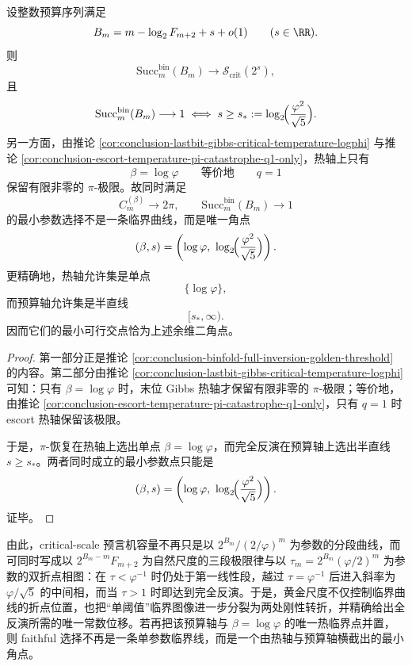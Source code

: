 \begin{theorem}[热轴与预算轴的余维二角点]\label{thm:conclusion-binfold-thermal-budget-codimtwo-corner}
设整数预算序列满足
\[
B_m=m-\log_2F_{m+2}+s+o(1)
\qquad (s\in\RR).
\]
则
\[
\mathrm{Succ}_m^{\mathrm{bin}}(B_m)\longrightarrow \mathcal S_{\mathrm{crit}}(2^s),
\]
且
\[
\mathrm{Succ}_m^{\mathrm{bin}}(B_m)\longrightarrow 1
\iff
s\ge s_*:=\log_2\!\Bigl(\frac{\varphi^2}{\sqrt5}\Bigr).
\]
另一方面，由推论 \ref{cor:conclusion-lastbit-gibbs-critical-temperature-logphi} 与推论 \ref{cor:conclusion-escort-temperature-pi-catastrophe-q1-only}，热轴上只有
\[
\beta=\log\varphi
\qquad\text{等价地}\qquad
q=1
\]
保留有限非零的 \(\pi\)-极限。故同时满足
\[
C_m^{(\beta)}\to 2\pi,
\qquad
\mathrm{Succ}_m^{\mathrm{bin}}(B_m)\to 1
\]
的最小参数选择不是一条临界曲线，而是唯一角点
\[
(\beta,s)
=
\left(
\log\varphi,\
\log_2\!\Bigl(\frac{\varphi^2}{\sqrt5}\Bigr)
\right).
\]
更精确地，热轴允许集是单点
\[
\{\log\varphi\},
\]
而预算轴允许集是半直线
\[
[s_*,\infty).
\]
因而它们的最小可行交点恰为上述余维二角点。
\end{theorem}
\begin{proof}
第一部分正是推论 \ref{cor:conclusion-binfold-full-inversion-golden-threshold} 的内容。第二部分由推论 \ref{cor:conclusion-lastbit-gibbs-critical-temperature-logphi} 可知：只有 \(\beta=\log\varphi\) 时，末位 Gibbs 热轴才保留有限非零的 \(\pi\)-极限；等价地，由推论 \ref{cor:conclusion-escort-temperature-pi-catastrophe-q1-only}，只有 \(q=1\) 时 escort 热轴保留该极限。

于是，\(\pi\)-恢复在热轴上选出单点 \(\beta=\log\varphi\)，而完全反演在预算轴上选出半直线 \(s\ge s_*\)。两者同时成立的最小参数点只能是
\[
(\beta,s)
=
\left(
\log\varphi,\
\log_2\!\Bigl(\frac{\varphi^2}{\sqrt5}\Bigr)
\right).
\]
证毕。
\end{proof}

\noindent
由此，critical-scale 预言机容量不再只是以 \(2^{B_m}/(2/\varphi)^m\) 为参数的分段曲线，而可同时写成以 \(2^{B_m-m}F_{m+2}\) 为自然尺度的三段极限律与以 \(\tau_m=2^{B_m}(\varphi/2)^m\) 为参数的双折点相图：在 \(\tau<\varphi^{-1}\) 时仍处于第一线性段，越过 \(\tau=\varphi^{-1}\) 后进入斜率为 \(\varphi/\sqrt5\) 的中间相，而当 \(\tau>1\) 时即达到完全反演。于是，黄金尺度不仅控制临界曲线的折点位置，也把“单阈值”临界图像进一步分裂为两处刚性转折，并精确给出全反演所需的唯一常数位移。若再把该预算轴与 \(\beta=\log\varphi\) 的唯一热临界点并置，则 faithful 选择不再是一条单参数临界线，而是一个由热轴与预算轴横截出的最小角点。

\endinput
